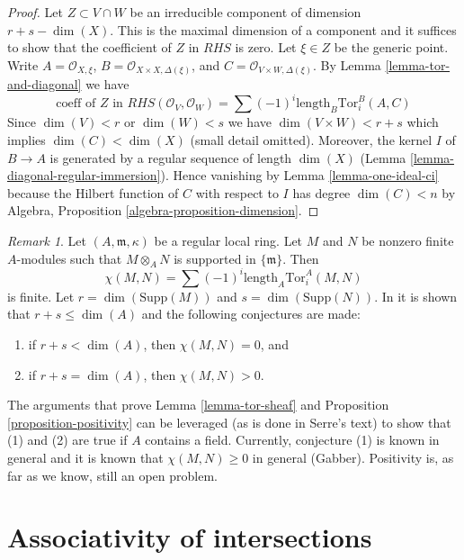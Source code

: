 \documentclass{stacks-project}
\theoremstyle{plain}
\theoremstyle{definition}
\theoremstyle{remark}
\newtheorem{remark}[subsection]{Remark}
\numberwithin{equation}{subsection}
\begin{document}
\begin{proof}
\medskip\noindent
Let $Z \subset V \cap W$ be an irreducible component of dimension
$r + s - \dim(X)$. This is the maximal dimension of a component
and it suffices to show that the coefficient of $Z$ in $RHS$ is zero.
Let $\xi \in Z$ be the generic point. Write $A = \mathcal{O}_{X, \xi}$,
$B = \mathcal{O}_{X \times X, \Delta(\xi)}$, and
$C = \mathcal{O}_{V \times W, \Delta(\xi)}$.
By Lemma \ref{lemma-tor-and-diagonal} we have
$$
\text{coeff of }Z\text{ in }
RHS(\mathcal{O}_V, \mathcal{O}_W) = 
\sum (-1)^i
\text{length}_B \text{Tor}_i^B(A, C)
$$
Since $\dim(V) < r$ or $\dim(W) < s$ we have $\dim(V \times W) < r + s$
which implies $\dim(C) < \dim(X)$ (small detail omitted). Moreover, the
kernel $I$ of $B \to A$ is generated by a regular sequence of
length $\dim(X)$ (Lemma \ref{lemma-diagonal-regular-immersion}).
Hence vanishing by Lemma \ref{lemma-one-ideal-ci} because
the Hilbert function of $C$ with respect to $I$ has degree $\dim(C) < n$
by Algebra, Proposition \ref{algebra-proposition-dimension}.
\end{proof}

\begin{remark}
\label{remark-Serre-conjectures}
Let $(A, \mathfrak m, \kappa)$ be a regular local ring.
Let $M$ and $N$ be nonzero finite $A$-modules such that $M \otimes_A N$
is supported in $\{\mathfrak m\}$. Then
$$
\chi(M, N) = \sum (-1)^i \text{length}_A \text{Tor}_i^A(M, N)
$$
is finite. Let $r = \dim(\text{Supp}(M))$ and $s = \dim(\text{Supp}(N))$.
In \cite{Serre_algebre_locale} it is shown that $r + s \leq \dim(A)$
and the following conjectures are made:
\begin{enumerate}
\item if $r + s < \dim(A)$, then $\chi(M, N) = 0$, and
\item if $r + s = \dim(A)$, then $\chi(M, N) > 0$.
\end{enumerate}
The arguments that prove Lemma \ref{lemma-tor-sheaf} and
Proposition \ref{proposition-positivity} can be leveraged
(as is done in Serre's text) to show that (1) and (2) are
true if $A$ contains a field. Currently, conjecture (1) is known
in general and it is known that $\chi(M, N) \geq 0$ in general (Gabber).
Positivity is, as far as we know, still an open problem.
\end{remark}



\section{Associativity of intersections}
\label{section-associative}
\end{document}
